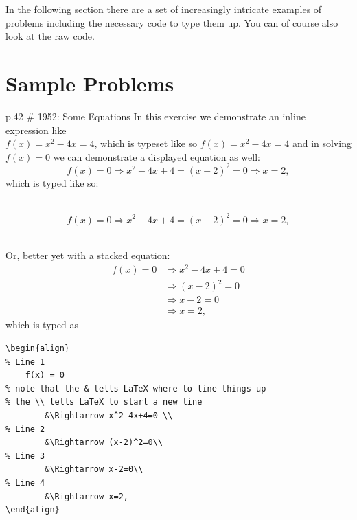 \documentclass[12pt]{article}
\begin{document}
\noindent
In the following section there are a set of increasingly intricate examples of problems including the necessary code to type them up.  You can of course also look at the raw code.

\section{Sample Problems}


\begin{problem}{p.42 \# 1952: Some Equations}
    In this exercise we demonstrate an inline expression like\\ \(f(x)=x^2-4x=4\), which is typeset like so \texttt{\(f(x)=x^2-4x=4\)} and in solving $f(x)=0$ we can demonstrate a displayed equation as well:
        \[f(x)=0\Rightarrow x^2-4x+4=(x-2)^2=0 \Rightarrow x=2,\]
    which is typed like so:
    
\begin{center}
\texttt{
\[f(x)=0\Rightarrow x^2-4x+4=(x-2)^2=0 \Rightarrow x=2,\]
}
\end{center}
    
    Or, better yet with a stacked equation:
    \begin{align}
        f(x) = 0 
            &\Rightarrow x^2-4x+4=0 \\
            &\Rightarrow (x-2)^2=0\\
            &\Rightarrow x-2=0\\
            &\Rightarrow x=2,
    \end{align}
    which is typed as

\begin{verbatim}
\begin{align}
% Line 1
    f(x) = 0 
% note that the & tells LaTeX where to line things up
% the \\ tells LaTeX to start a new line
        &\Rightarrow x^2-4x+4=0 \\
% Line 2
        &\Rightarrow (x-2)^2=0\\
% Line 3
        &\Rightarrow x-2=0\\
% Line 4
        &\Rightarrow x=2,
\end{align}
\end{verbatim}

\end{problem}
\end{document}
